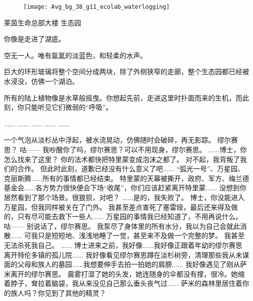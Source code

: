 \documentclass[openany]{book}
\begin{document}
\begin{figure}[h]
    \centering
    \texttt{[image: Avg\_bg\_38\_g11\_ecolab\_waterlogging]}
\end{figure}
莱茵生命总部大楼 生态园\par
你像是走进了湖底。\par
空无一人。唯有氤氲的淡蓝色，和轻柔的水声。\par
巨大的环形玻璃将整个空间分成两块，除了外侧狭窄的走廊，整个生态园都已经被水浸没，仿佛一个湖泊。\par
所有的陆上植物像是水草般摇曳。你想起先前，走进这里时扑面而来的生机，而此刻，你只能听见它们微弱的“呼吸”。

\begin{dialogue}
     ......
     ......
     ......
     ......
     ......\par
    一个气泡从淡杉丛中浮起，被水流晃动，仿佛随时会破碎，再无影踪。
     缪尔赛思？
     咕——
     我吵醒你了吗，缪尔赛思？可以不用现身，缪尔赛思。
     ......博士，你怎么找来了这里？
     你的法术都快把特里蒙变成泡沫之都了。
     对不起，我背叛了我们的合作。
     但此时此刻，道歉已经没有什么意义了吧......
     “弧光一号”、万星园、克丽斯腾......所有的事情都已经结束。
     特里蒙的天幕被撕开，政府、军方、梅兰德基金会......各方势力很快便会下场“收尾”，你们应该赶紧离开特里蒙......
     没想到你居然看到了那个场景。很狼狈，对吧？
     ......是的，我失败了。
     博士，你没能进入万星园，但我同样被关在了门外。
     我甚至差点害死了塞雷娅，最后还来得及做的，只有尽可能去救下一些人......
     万星园的事情我已经知道了，不用再说什么。
     咕——
     别说话了，缪尔赛思。
     我泵尽了身体里的所有水分，我以为自己会就此消散......
     可我只是短短地、浅浅地睡了一觉，甚至来不及做一个完整的梦。
     我甚至无法杀死我自己。
     ......
     博士进来之前，我好像......我好像正跟着年幼的缪尔赛思离开特伦多镇的孤儿院......
     我好像看见缪尔赛思蹲在淡杉树旁，清理那些我从未谋面的父母和族人的墓园......我想要伸手去拍一拍她的肩膀......
     我好像遇见了刚从萨米离开的缪尔赛思。
     晨雾打湿了她的头发，她连随身的伞都没有撑，很冷。她缩着脖子，耷拉着脑袋，我从来没见自己那么垂头丧气过......
     萨米的森林里居住着你的族人吗？你见到了其他的精灵？

\end{dialogue}
\end{document}
